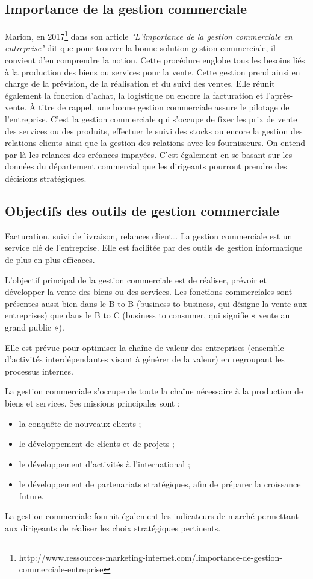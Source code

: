 \subsection{Importance de la gestion commerciale}
Marion, en 2017\footnote{http://www.ressources-marketing-internet.com/limportance-de-gestion-commerciale-entreprise} dans son article \textit{"L’importance de la gestion commerciale en entreprise"} dit que pour trouver la bonne solution gestion commerciale, il convient d’en comprendre la notion. Cette procédure englobe tous les besoins liés à la production des biens ou services pour la vente. Cette gestion prend ainsi en charge de la prévision, de la réalisation et du suivi des ventes. Elle réunit également la fonction d’achat, la logistique ou encore la facturation et l’après-vente. À titre de rappel, une bonne gestion commerciale assure le pilotage de l’entreprise. C’est la gestion commerciale qui s’occupe de fixer les prix de vente des services ou des produits, effectuer le suivi des stocks ou encore la gestion des relations clients ainsi que la gestion des relations avec les fournisseurs. On entend par là les relances des créances impayées. C’est également en se basant sur les données du département commercial que les dirigeants pourront prendre des décisions stratégiques. 

\subsection{Objectifs des outils de gestion commerciale}
Facturation, suivi de livraison, relances client… La gestion commerciale est un service clé de l’entreprise. Elle est facilitée par des outils de gestion informatique de plus en plus efficaces.

L'objectif principal de la gestion commerciale est de réaliser, prévoir et développer la vente des biens ou des services. Les fonctions commerciales sont présentes aussi bien dans le B to B (business to business, qui désigne la vente aux entreprises) que dans le B to C (business to consumer, qui signifie « vente au grand public »).

Elle est prévue pour optimiser la chaîne de valeur des entreprises (ensemble d'activités interdépendantes visant à générer de la valeur) en regroupant les processus internes.

La gestion commerciale s’occupe de toute la chaîne nécessaire à la production de biens et services. Ses missions principales sont :
\begin{itemize}
    \item la conquête de nouveaux clients ;
    \item le développement de clients et de projets ;
    \item le développement d’activités à l’international ;
    \item le développement de partenariats stratégiques, afin de préparer la croissance future.
\end{itemize}
La gestion commerciale fournit également les indicateurs de marché permettant aux dirigeants de réaliser les choix stratégiques pertinents.

